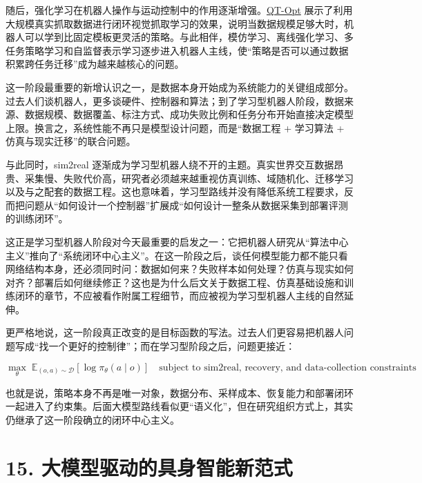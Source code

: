 随后，强化学习在机器人操作与运动控制中的作用逐渐增强。\href{https://arxiv.org/abs/1806.10293}{QT-Opt} 展示了利用大规模真实抓取数据进行闭环视觉抓取学习的效果，说明当数据规模足够大时，机器人可以学到比固定模板更灵活的策略。与此相伴，模仿学习、离线强化学习、多任务策略学习和自监督表示学习逐步进入机器人主线，使“策略是否可以通过数据积累跨任务迁移”成为越来越核心的问题。

这一阶段最重要的新增认识之一，是数据本身开始成为系统能力的关键组成部分。过去人们谈机器人，更多谈硬件、控制器和算法；到了学习型机器人阶段，数据来源、数据规模、数据覆盖、标注方式、成功失败比例和任务分布开始直接决定模型上限。换言之，系统性能不再只是模型设计问题，而是“数据工程 + 学习算法 + 仿真与现实迁移”的联合问题。

与此同时，sim2real 逐渐成为学习型机器人绕不开的主题。真实世界交互数据昂贵、采集慢、失败代价高，研究者必须越来越重视仿真训练、域随机化、迁移学习以及与之配套的数据工程。这也意味着，学习型路线并没有降低系统工程要求，反而把问题从“如何设计一个控制器”扩展成“如何设计一整条从数据采集到部署评测的训练闭环”。

这正是学习型机器人阶段对今天最重要的启发之一：它把机器人研究从“算法中心主义”推向了“系统闭环中心主义”。在这一阶段之后，谈任何模型能力都不能只看网络结构本身，还必须同时问：数据如何来？失败样本如何处理？仿真与现实如何对齐？部署后如何继续修正？这也是为什么后文关于数据工程、仿真基础设施和训练闭环的章节，不应被看作附属工程细节，而应被视为学习型机器人主线的自然延伸。

更严格地说，这一阶段真正改变的是目标函数的写法。过去人们更容易把机器人问题写成“找一个更好的控制律”；而在学习型阶段之后，问题更接近：

\begingroup
\scriptsize
\begin{equation*}
\max_{\theta}\; \mathbb{E}_{(o,a)\sim \mathcal{D}}[\log \pi_\theta(a\mid o)]
\quad \text{subject to sim2real, recovery, and data-collection constraints}
\end{equation*}
\endgroup

也就是说，策略本身不再是唯一对象，数据分布、采样成本、恢复能力和部署闭环一起进入了约束集。后面大模型路线看似更“语义化”，但在研究组织方式上，其实仍继承了这一阶段确立的闭环中心主义。

\section*{15. 大模型驱动的具身智能新范式}

